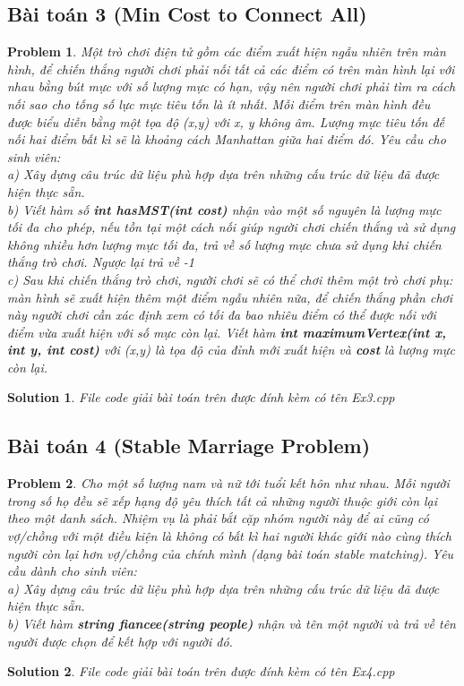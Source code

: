 \documentclass[a4paper]{article}
\newtheorem*{problem}{Problem}
\newtheorem*{sol}{Solution}
\begin{document}
    \subsection{Bài toán 3 (Min Cost to Connect All)}
    \begin{problem}
Một trò chơi điện tử gồm các điểm xuất hiện ngẫu nhiên trên màn hình, để chiến thắng người chơi phải nối tất cả các điểm có trên màn hình lại với nhau bằng bút mực với số lượng mực có hạn, vậy nên người chơi phải tìm ra cách nối sao cho tống số lực mực tiêu tốn là ít nhất. Mỗi điểm trên màn hình đều được biểu diễn bằng một tọa độ (x,y) với x, y không âm. Lượng mực tiêu tốn đế nối hai điểm bất kì sẽ là khoảng cách  Manhattan giữa hai điểm đó. Yêu cầu cho sinh viên:  \\
a) Xây dựng câu trúc dữ liệu phù hợp dựa trên những cấu trúc dữ liệu đã được hiện thực sẵn.\\
b) Viết hàm số \textbf{ int hasMST(int cost)} nhận vào một số nguyên là lượng mực tối đa cho phép, nếu tồn tại một cách nối giúp người chơi chiến thắng và sử dụng không nhiều hơn lượng mực tối đa, trả về số lượng mực chưa sử dụng khi chiến thắng trò chơi. Ngược lại trả về -1\\
c) Sau khi chiến thắng trò chơi, người chơi sẽ có thể chơi thêm một trò chơi phụ: màn hình sẽ xuất hiện thêm một điểm ngẫu nhiên nữa, để chiến thắng phần chơi này người chơi cần xác định xem có tối đa bao nhiêu điểm có thể được nối với điểm vừa xuất hiện với số mực còn lại. Viết hàm \textbf{int maximumVertex(int x, int y, int cost)} với (x,y) là tọa độ của đỉnh mới xuất hiện và \textbf{cost} là lượng mực còn lại.
    \end{problem}
    \begin{sol}
        File code giải bài toán trên được đính kèm có tên Ex3.cpp
    \end{sol}
    \subsection{Bài toán 4 (Stable Marriage Problem)}
    \begin{problem}
Cho một số lượng nam và nữ tới tuổi kết hôn như nhau. Mỗi người trong số họ đều sẽ xếp hạng độ yêu thích tất cả những người thuộc giới còn lại theo một danh sách. Nhiệm vụ là phải bắt cặp nhóm người này để ai cũng có vợ/chồng với một điều kiện là không có bất kì hai người khác giới nào cùng thích người còn lại hơn vợ/chồng của chính mình (dạng bài toán stable matching). Yêu cầu dành cho sinh viên: \\
a) Xây dựng câu trúc dữ liệu phù hợp dựa trên những cấu trúc dữ liệu đã được hiện thực sẵn. \\
b) Viết hàm \textbf{string fiancee(string people)} nhận và tên một người và trả về tên người được chọn để kết hợp với người đó.
    \end{problem}
    \begin{sol}
        File code giải bài toán trên được đính kèm có tên Ex4.cpp
    \end{sol}
\end{document}
